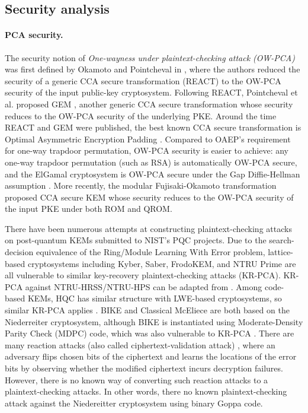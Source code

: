 \documentclass[runningheads]{llncs}
\begin{document}
\subsection{Security analysis}\label{sec:security-analysis}
\paragraph{PCA security.} The security notion of \textit{One-wayness under plaintext-checking attack (OW-PCA)} was first defined by Okamoto and Pointcheval in \cite{DBLP:conf/ctrsa/OkamotoP01}, where the authors reduced the security of a generic CCA secure transformation (REACT) to the OW-PCA security of the input public-key cryptosystem. Following REACT, Pointcheval et al. proposed GEM \cite{DBLP:conf/ctrsa/CoronHJPPT02}, another generic CCA secure transformation whose security reduces to the OW-PCA security of the underlying PKE. Around the time REACT and GEM were published, the best known CCA secure transformation is Optimal Asymmetric Encryption Padding \cite{DBLP:conf/eurocrypt/BellareR94}. Compared to OAEP's requirement for one-way trapdoor permutation, OW-PCA security is easier to achieve: any one-way trapdoor permutation (such as RSA) is automatically OW-PCA secure, and the ElGamal cryptosystem is OW-PCA secure under the Gap Diffie-Hellman assumption \cite{DBLP:conf/pkc/OkamotoP01}. More recently, the modular Fujisaki-Okamoto transformation \cite{DBLP:conf/tcc/HofheinzHK17} proposed CCA secure KEM whose security reduces to the OW-PCA security of the input PKE under both ROM and QROM.

There have been numerous attempts at constructing plaintext-checking attacks on post-quantum KEMs submitted to NIST's PQC projects. Due to the search-decision equivalence of the Ring/Module Learning With Error problem, lattice-based cryptosystems including Kyber, Saber, FrodoKEM, and NTRU Prime are all vulnerable to similar key-recovery plaintext-checking attacks (KR-PCA)\cite{DBLP:conf/crypto/00010N20,DBLP:journals/tches/RaviRCB20,DBLP:journals/tches/UenoXTITH22,DBLP:journals/tches/TanakaUXITH23}. KR-PCA against NTRU-HRSS/NTRU-HPS can be adapted from \cite{Hoffstein1999,DBLP:conf/crypto/JaulmesJ00,cryptoeprint:2019/1022,cryptoeprint:2021/168}. Among code-based KEMs, HQC has similar structure with LWE-based cryptosystems, so similar KR-PCA applies \cite{DBLP:conf/acns/Huguenin-Dumittan20}. BIKE and Classical McEliece are both based on the Niederreiter cryptosystem, although BIKE is instantiated using Moderate-Density Parity Check (MDPC) code, which was also vulnerable to KR-PCA \cite{DBLP:conf/asiacrypt/Guo0S16}. There are many reaction attacks (also called ciphertext-validation attack) \cite{DBLP:conf/icics/HallGS99}, where an adversary flips chosen bits of the ciphertext and learns the locations of the error bits by observing whether the modified ciphertext incurs decryption failures. However, there is no known way of converting such reaction attacks to a plaintext-checking attacks. In other words, there no known plaintext-checking attack against the Niedereitter cryptosystem using binary Goppa code.
\end{document}
